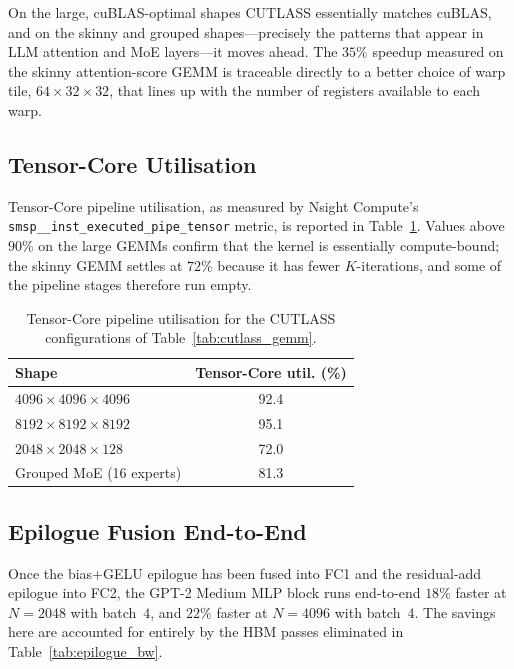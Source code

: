 On the large, cuBLAS-optimal shapes CUTLASS essentially matches
cuBLAS, and on the skinny and grouped shapes---precisely the
patterns that appear in LLM attention and MoE layers---it moves
ahead. The $35\%$ speedup measured on the skinny attention-score
GEMM is traceable directly to a better choice of warp tile,
$64 \times 32 \times 32$, that lines up with the number of
registers available to each warp.

\subsection{Tensor-Core Utilisation}\label{sec:cutlass_tc_util}
Tensor-Core pipeline utilisation, as measured by Nsight Compute's
\texttt{smsp\_\_inst\_executed\_pipe\_tensor} metric, is reported
in Table~\ref{tab:tc_util}. Values above $90\%$ on the large GEMMs
confirm that the kernel is essentially compute-bound; the skinny
GEMM settles at $72\%$ because it has fewer $K$-iterations, and
some of the pipeline stages therefore run empty.

\begin{table}[h]
\centering
\caption{Tensor-Core pipeline utilisation for the CUTLASS
         configurations of Table~\ref{tab:cutlass_gemm}.}
\label{tab:tc_util}
\begin{tabular}{lc}
\toprule
\textbf{Shape} & \textbf{Tensor-Core util. (\%)} \\
\midrule
$4096\times4096\times4096$ & 92.4 \\
$8192\times8192\times8192$ & 95.1 \\
$2048\times2048\times128$  & 72.0 \\
Grouped MoE (16 experts)   & 81.3 \\
\bottomrule
\end{tabular}
\end{table}

\subsection{Epilogue Fusion End-to-End}\label{sec:cutlass_fusion_e2e}
Once the bias+GELU epilogue has been fused into FC1 and the
residual-add epilogue into FC2, the GPT-2 Medium MLP block runs
end-to-end $18\%$ faster at $N = 2048$ with batch~$4$, and $22\%$
faster at $N = 4096$ with batch~$4$. The savings here are
accounted for entirely by the HBM passes eliminated in
Table~\ref{tab:epilogue_bw}.

